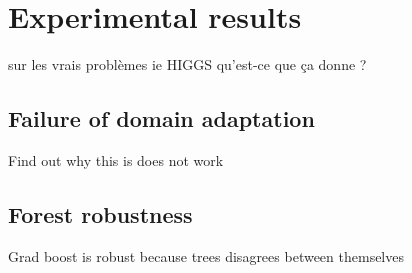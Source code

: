 
\chapter{Experimental results}
\label{chap:systml}
\ifpdf
    \graphicspath{{Chapter4/Figs/Raster/}{Chapter4/Figs/PDF/}{Chapter4/Figs/}}
\else
    \graphicspath{{Chapter4/Figs/Vector/}{Chapter4/Figs/}}
\fi


sur les vrais problèmes ie HIGGS qu'est-ce que ça donne ?

\section{Failure of domain adaptation} %
\label{sec:failure_of_domain_adaptation}


Find out why this is does not work


\section{Forest robustness} %
\label{sec:forest_robustness}

Grad boost is robust because trees disagrees between themselves

